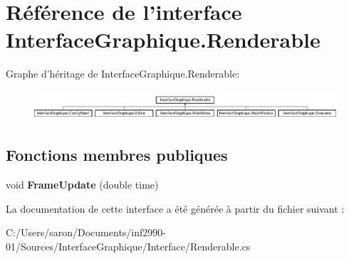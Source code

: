 \hypertarget{interface_interface_graphique_1_1_renderable}{\section{Référence de l'interface Interface\-Graphique.\-Renderable}
\label{interface_interface_graphique_1_1_renderable}
}
Graphe d'héritage de Interface\-Graphique.\-Renderable\-:\begin{figure}[H]
\begin{center}
\leavevmode
\includegraphics[height=1.098039cm]{interface_interface_graphique_1_1_renderable}
\end{center}
\end{figure}
\subsection*{Fonctions membres publiques}
\begin{DoxyCompactItemize}
\item 
\hypertarget{interface_interface_graphique_1_1_renderable_a25c30c0df9a336f382132c852fe403b0}{void {\bfseries Frame\-Update} (double time)}\label{interface_interface_graphique_1_1_renderable_a25c30c0df9a336f382132c852fe403b0}

\end{DoxyCompactItemize}


La documentation de cette interface a été générée à partir du fichier suivant \-:\begin{DoxyCompactItemize}
\item 
C\-:/\-Users/saron/\-Documents/inf2990-\/01/\-Sources/\-Interface\-Graphique/\-Interface/Renderable.\-cs\end{DoxyCompactItemize}
